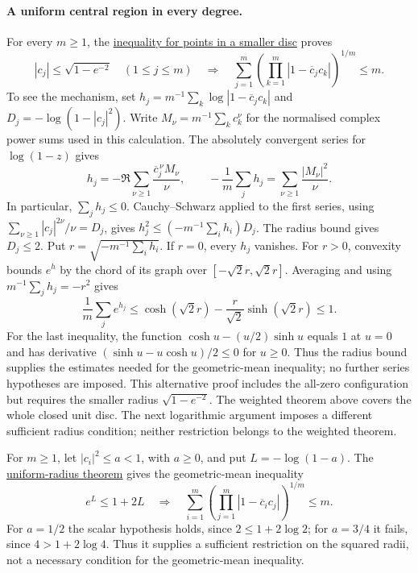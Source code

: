 \paragraph{A uniform central region in every degree.}
For every $m\ge1$, the
\href{https://github.com/wcook04/plectis-erdos/blob/3be82b1a7340284aea72e9a5c8493cb020843921/ErdosProblems/Erdos1041/FreePointCentralCompletion.lean#L39}{inequality for points in a smaller disc}
proves
\[
 |c_j|\le\sqrt{1-e^{-2}}\quad(1\le j\le m)
 \quad\Longrightarrow\quad
 \sum_{j=1}^m\left(\prod_{k=1}^m|1-\overline c_jc_k|\right)^{1/m}\le m.
\]
To see the mechanism, set
$h_j=m^{-1}\sum_k\log|1-\overline c_jc_k|$ and
$D_j=-\log(1-|c_j|^2)$. Write
$M_\nu=m^{-1}\sum_k c_k^\nu$ for the normalised complex power sums used in this
calculation. The absolutely convergent series for $\log(1-z)$ gives
\[
 h_j=-\Re\sum_{\nu\ge1}\frac{\overline c_j^{\,\nu}M_\nu}{\nu},
 \qquad
 -\frac1m\sum_jh_j=\sum_{\nu\ge1}\frac{|M_\nu|^2}{\nu}.
\]
In particular, $\sum_jh_j\le0$. Cauchy--Schwarz applied to the first
series, using
$\sum_{\nu\ge1}|c_j|^{2\nu}/\nu=D_j$, gives
$h_j^2\le(-m^{-1}\sum_i h_i)D_j$. The radius bound gives $D_j\le2$.
Put $r=\sqrt{-m^{-1}\sum_i h_i}$. If $r=0$, every $h_j$ vanishes.
For $r>0$, convexity bounds $e^h$ by the chord of its graph over
$[-\sqrt2r,\sqrt2r]$. Averaging and using $m^{-1}\sum_jh_j=-r^2$ gives
\[
 \frac1m\sum_j e^{h_j}
 \le\cosh(\sqrt2r)-\frac r{\sqrt2}\sinh(\sqrt2r)\le1.
\]
For the last inequality, the function $\cosh u-(u/2)\sinh u$ equals
$1$ at $u=0$ and has derivative $(\sinh u-u\cosh u)/2\le0$ for
$u\ge0$. Thus the radius bound supplies the estimates needed for the
geometric-mean inequality; no further series hypotheses are imposed.
This alternative proof includes the all-zero configuration but requires
the smaller radius $\sqrt{1-e^{-2}}$. The weighted theorem above covers
the whole closed unit disc. The next logarithmic argument imposes a
different sufficient radius condition; neither restriction belongs to
the weighted theorem.

For $m\ge1$, let $|c_i|^2\le a<1$, with $a\ge0$, and put
$L=-\log(1-a)$. The
\href{https://github.com/wcook04/plectis-erdos/blob/457e0c74b2666f7fb2d825c967e49e439a600b23/ErdosProblems/Erdos1041/FreePointUniformRadius.lean#L84}{uniform-radius theorem}
gives the geometric-mean inequality
\[
 e^L\le1+2L\quad\Longrightarrow\quad
 \sum_{i=1}^m\left(\prod_{j=1}^m|1-\overline c_i c_j|\right)^{1/m}\le m.
\]
For $a=1/2$ the scalar hypothesis holds, since
$2\le1+2\log2$; for $a=3/4$ it fails, since $4>1+2\log4$.
Thus it supplies a sufficient restriction on the squared radii, not a
necessary condition for the geometric-mean inequality.

